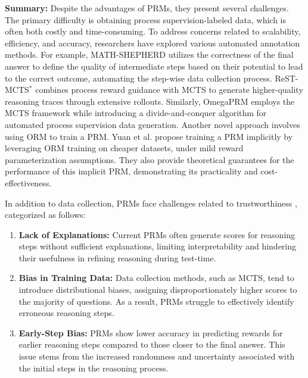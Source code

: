 \noindent\textbf{Summary:} 
Despite the advantages of PRMs, they present several challenges. 
The primary difficulty is obtaining process supervision-labeled data, which is often both costly and time-consuming. 
To address concerns related to scalability, efficiency, and accuracy, researchers have explored various automated annotation methods. 
For example, MATH-SHEPHERD \cite{wang2024math} utilizes the correctness of the final answer to define the quality of intermediate steps based on their potential to lead to the correct outcome, automating the step-wise data collection process. ReST-MCTS$^{*}$ \cite{zhang2024rest} combines process reward guidance with MCTS to generate higher-quality reasoning traces through extensive rollouts. 
Similarly, OmegaPRM \cite{luo2024improve} employs the MCTS framework while introducing a divide-and-conquer algorithm for automated process supervision data generation. 
Another novel approach involves using ORM to train a PRM. Yuan et al. \cite{yuan2024free} propose training a PRM implicitly by leveraging ORM training on cheaper datasets, under mild reward parameterization assumptions. 
They also provide theoretical guarantees for the performance of this implicit PRM, demonstrating its practicality and cost-effectiveness.

In addition to data collection, PRMs face challenges related to trustworthiness \cite{sun2025rearter}, categorized as follows: 
\begin{enumerate}[itemindent=0em]
\item \textbf{Lack of Explanations:} Current PRMs often generate scores for reasoning steps without sufficient explanations, limiting interpretability and hindering their usefulness in refining reasoning during test-time. 

\item \textbf{Bias in Training Data:} Data collection methods, such as MCTS, tend to introduce distributional biases, assigning disproportionately higher scores to the majority of questions. As a result, PRMs struggle to effectively identify erroneous reasoning steps. 

\item \textbf{Early-Step Bias:} PRMs show lower accuracy in predicting rewards for earlier reasoning steps compared to those closer to the final answer. This issue stems from the increased randomness and uncertainty associated with the initial steps in the reasoning process.

\end{enumerate}



